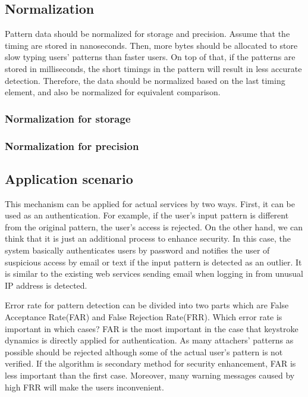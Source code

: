 \documentclass[twocolumn,showpacs,%
  nofootinbib,aps,%
  eqsecnum,prd,notitlepage,showkeys,10pt]{revtex4-1}
\begin{document}
\subsection{Normalization}
Pattern data should be normalized for storage and precision. Assume that the timing are stored in nanoseconds. Then, more bytes should be allocated to store slow typing users' patterns than faster users. On top of that, if the patterns are stored in milliseconds, the short timings in the pattern will result in less accurate detection. Therefore, the data should be normalized based on the last timing element, and also be normalized for equivalent comparison.

\subsubsection{Normalization for storage}
\subsubsection{Normalization for precision}

\subsection{Application scenario}
This mechanism can be applied for actual services by two ways. First, it can be used as an authentication. For example, if the user's input pattern is different from the original pattern, the user's access is rejected. On the other hand, we can think that it is just an additional process to enhance security. In this case, the system basically authenticates users by password and notifies the user of suspicious access by email or text if the input pattern is detected as an outlier. It is similar to the existing web services sending email when logging in from unusual IP address is detected.\par
Error rate for pattern detection can be divided into two parts which are False Acceptance Rate(FAR) and False Rejection Rate(FRR)\cite{cho2000web}. Which error rate is important in which cases? FAR is the most important in the case that keystroke dynamics is directly applied for authentication. As many attachers' patterns as possible should be rejected although some of the actual user's pattern is not verified. If the algorithm is secondary method for security enhancement, FAR is less important than the first case. Moreover, many warning messages caused by high FRR will make the users inconvenient.
\end{document}
